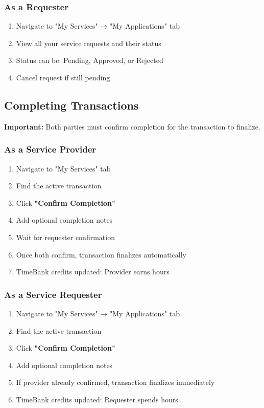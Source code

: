 \documentclass[12pt,a4paper]{report}
\begin{document}
\subsubsection{As a Requester}

\begin{enumerate}
    \item Navigate to "My Services" → "My Applications" tab
    \item View all your service requests and their status
    \item Status can be: Pending, Approved, or Rejected
    \item Cancel request if still pending
\end{enumerate}

\subsection{Completing Transactions}

\textbf{Important:} Both parties must confirm completion for the transaction to finalize.

\subsubsection{As a Service Provider}

\begin{enumerate}
    \item Navigate to "My Services" tab
    \item Find the active transaction
    \item Click \textbf{"Confirm Completion"}
    \item Add optional completion notes
    \item Wait for requester confirmation
    \item Once both confirm, transaction finalizes automatically
    \item TimeBank credits updated: Provider earns hours
\end{enumerate}

\subsubsection{As a Service Requester}

\begin{enumerate}
    \item Navigate to "My Services" → "My Applications" tab
    \item Find the active transaction
    \item Click \textbf{"Confirm Completion"}
    \item Add optional completion notes
    \item If provider already confirmed, transaction finalizes immediately
    \item TimeBank credits updated: Requester spends hours
\end{enumerate}
\end{document}
